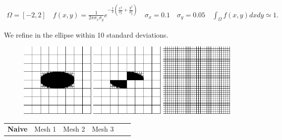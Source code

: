 \documentclass[8pt]{beamer}
\begin{document}
\begin{frame}\begin{footnotesize}
\begin{gather*}
 \Omega = [-2, 2] \quad f(x,y) = \frac{1}{2 \pi \sigma_x \sigma_y} e^{-\frac{1}{2} \left ( \frac{x^2}{\sigma_x^2}+\frac{y^2}{\sigma_y^2}  \right )} \quad \sigma_x = 0.1 \quad \sigma_y = 0.05 \quad \int_{\Omega}f(x,y)dx dy \simeq 1.
\end{gather*}\end{footnotesize}
We refine in the ellipse within 10 standard deviations.
 \begin{figure}[!h]
\begin{center}
\includegraphics[width=0.32\textwidth]{./figures/integrator/gauss_1.pdf}
\includegraphics[width=0.32\textwidth]{./figures/integrator/gauss_2.pdf}
\includegraphics[width=0.32\textwidth]{./figures/integrator/gauss_3.pdf}
\end{center}
\end{figure}
\begin{footnotesize}
\begin{center}
\begin{tabular}{|c|c|c|c|c|c|c|c|c|} 
   \hline
    \textbf{Naive} & \multicolumn{2}{|c|}{Mesh 1} & \multicolumn{2}{|c|}{Mesh 2} & \multicolumn{2}{|c|}{Mesh 3}\\

\end{tabular}
\end{center}
\end{footnotesize}
\end{frame}
\end{document}
